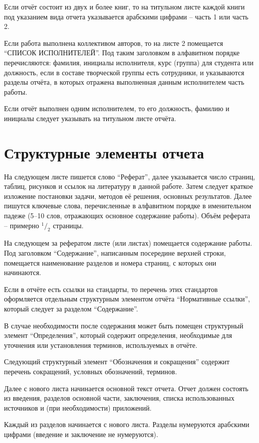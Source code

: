 \documentclass[utf8,12pt, coursreport]{G7-32}
\begin{document}
Если отчёт состоит из двух и более книг, то на титульном листе каждой книги под указанием вида отчета указывается арабскими цифрами -- часть 1 или часть 2.

Если работа выполнена коллективом авторов, то на листе 2 помещается ``СПИСОК ИСПОЛНИТЕЛЕЙ''. Под таким заголовком в алфавитном порядке перечисляются: фамилия, инициалы исполнителя, курс (группа) для студента или должность, если в составе творческой группы есть сотрудники, и указываются разделы отчёта, в которых отражена выполненная данным исполнителем часть работы.

Если отчёт выполнен одним исполнителем, то его должность, фамилию и инициалы следует указывать на титульном листе отчёта.

\section{Структурные элементы отчета}

На следующем листе пишется слово ``Реферат'', далее указывается число страниц, таблиц, рисунков и ссылок на литературу в данной работе. Затем следует краткое изложение постановки задачи, методов её решения, основных результатов. Далее пишутся ключевые слова, перечисленные в алфавитном порядке в именительном падеже (5--10 слов, отражающих основное содержание работы). Объём реферата -- примерно $^1/_2$ страницы.

На следующем за рефератом листе (или листах) помещается содержание работы. Под заголовком ``Содержание'', написанным посередине верхней строки, помещается наименование разделов и номера страниц, с которых они начинаются.

Если в отчёте есть ссылки на стандарты, то перечень этих стандартов оформляется отдельным структурным элементом отчёта ``Нормативные ссылки'', который следует за разделом ``Содержание''.

В случае необходимости после содержания может быть помещен структурный элемент ``Определения'', который содержит определения, необходимые для уточнения или установления терминов, используемых в отчёте.

Следующий структурный элемент ``Обозначения и сокращения'' содержит перечень сокращений, условных обозначений, терминов.

Далее с нового листа начинается основной текст отчета. Отчет должен состоять из введения, разделов основной части, заключения, списка использованных источников и (при необходимости) приложений.

Каждый из разделов начинается с нового листа. Разделы нумеруются арабскими цифрами (введение и заключение не нумеруются).
\end{document}
